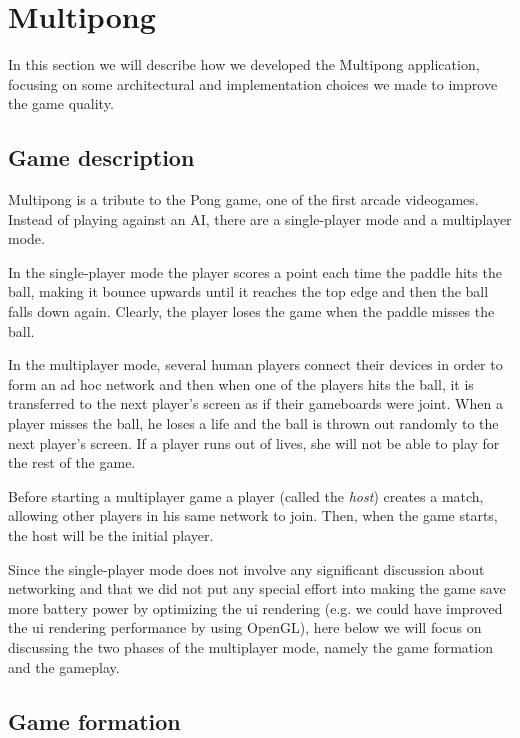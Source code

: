 \section{Multipong} %

In this section we will describe how we developed the Multipong application,
focusing on some architectural and implementation choices we made to improve
the game quality.

\subsection{Game description} %

Multipong is a tribute to the Pong game, one of the first arcade videogames.
Instead of playing against an AI, there are a single-player mode and a
multiplayer mode.

In the single-player mode the player scores a point each time the paddle hits
the ball, making it bounce upwards until it reaches the top edge and then the
ball falls down again. Clearly, the player loses the game when the paddle misses
the ball.

In the multiplayer mode, several human players connect their devices in order
to form an ad hoc network and then when one of the players hits the ball, it is
transferred to the next player's screen as if their gameboards were joint.
When a player misses the ball, he loses a life and the ball is thrown out
randomly to the next player's screen.
If a player runs out of lives, she will not be able to play for the rest of the
game.

Before starting a multiplayer game a player (called the \textit{host}) creates
a match, allowing other players in his same network to join. Then, when the
game starts, the host will be the initial player.

Since the single-player mode does not involve any significant discussion about
networking and that we did not put any special effort into making the game save
more battery power by optimizing the ui rendering (e.g. we could have improved
the ui rendering performance by using OpenGL), here below we will focus on
discussing the two phases of the multiplayer mode, namely the game formation
and the gameplay.

\subsection{Game formation}

